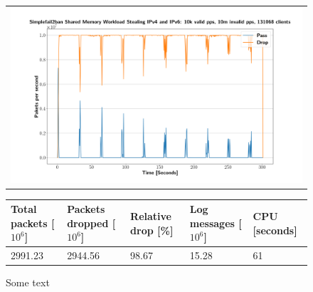 \begin{figure}[p]
	\label{fig:simplefail2ban:shm:ws}
	\centering
	\scriptsize
	\begin{tabular}{c}
    	\centerline{\includegraphics[width=1.2\textwidth]{images/simplefail2ban_shm_ws_ipv46_v10k_iv10m_c131068.png}}
	\end{tabular}
	\begin{tabular}{lllll}
		\toprule
		\textbf{Total packets [$10^6$]} & \textbf{Packets dropped [$10^6$]} & \textbf{Relative drop [\%]} & \textbf{Log messages [$10^6$]} & \textbf{CPU [seconds]} \\ \midrule 
		2991.23 & 2944.56 & 98.67 & 15.28 & 61 \\
		\bottomrule
	\end{tabular}
	\caption[Simplefail2ban Shared Memory with Workload Sharing]{Some text}
\end{figure}


